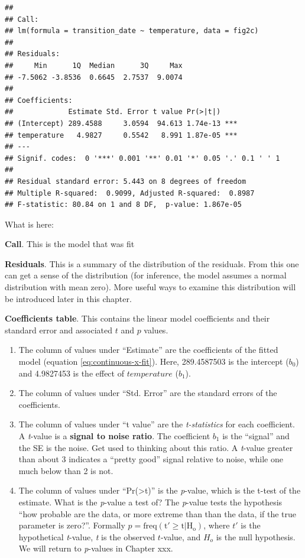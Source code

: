 \documentclass[]{book}
\providecommand{\tightlist}{%
  \setlength{\itemsep}{0pt}\setlength{\parskip}{0pt}}
\begin{document}
\begin{verbatim}
## 
## Call:
## lm(formula = transition_date ~ temperature, data = fig2c)
## 
## Residuals:
##     Min      1Q  Median      3Q     Max 
## -7.5062 -3.8536  0.6645  2.7537  9.0074 
## 
## Coefficients:
##             Estimate Std. Error t value Pr(>|t|)    
## (Intercept) 289.4588     3.0594  94.613 1.74e-13 ***
## temperature   4.9827     0.5542   8.991 1.87e-05 ***
## ---
## Signif. codes:  0 '***' 0.001 '**' 0.01 '*' 0.05 '.' 0.1 ' ' 1
## 
## Residual standard error: 5.443 on 8 degrees of freedom
## Multiple R-squared:  0.9099, Adjusted R-squared:  0.8987 
## F-statistic: 80.84 on 1 and 8 DF,  p-value: 1.867e-05
\end{verbatim}

What is here:

\textbf{Call}. This is the model that was fit

\textbf{Residuals}. This is a summary of the distribution of the residuals. From this one can get a sense of the distribution (for inference, the model assumes a normal distribution with mean zero). More useful ways to examine this distribution will be introduced later in this chapter.

\textbf{Coefficients table}. This contains the linear model coefficients and their standard error and associated \(t\) and \(p\) values.

\begin{enumerate}
\def\labelenumi{\arabic{enumi}.}
\tightlist
\item
  The column of values under ``Estimate'' are the coefficients of the fitted model (equation \eqref{eq:continuous-x-fit}). Here, 289.4587503 is the intercept (\(b_0\)) and 4.9827453 is the effect of \(temperature\) (\(b_1\)).
\item
  The column of values under ``Std. Error'' are the standard errors of the coefficients.
\item
  The column of values under ``t value'' are the \emph{t-statistics} for each coefficient. A \emph{t}-value is a \textbf{signal to noise ratio}. The coefficient \(b_1\) is the ``signal'' and the SE is the noise. Get used to thinking about this ratio. A \emph{t}-value greater than about 3 indicates a ``pretty good'' signal relative to noise, while one much below than 2 is not.
\item
  The column of values under ``Pr(\textgreater\textbar t\textbar)'' is the \emph{p}-value, which is the t-test of the estimate. What is the \emph{p}-value a test of? The \emph{p}-value tests the hypothesis ``how probable are the data, or more extreme than than the data, if the true parameter is zero?''. Formally \(p = \mathrm{freq(t' \ge t|H_o)}\), where \(t'\) is the hypothetical \emph{t}-value, \emph{t} is the observed \(t\)-value, and \(H_o\) is the null hypothesis. We will return to \emph{p}-values in Chapter xxx.
\end{enumerate}
\end{document}
